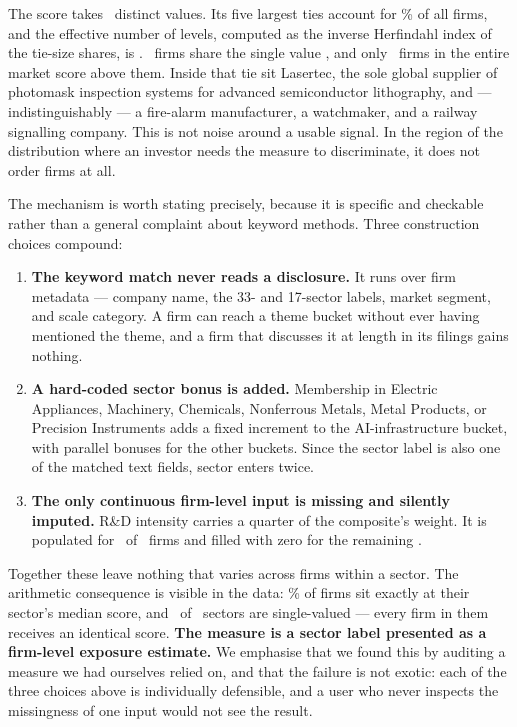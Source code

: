 \documentclass[a4paper,11pt]{article}
\begin{document}
The score takes \SatDistinct\ distinct values. Its five largest ties account for
\SatTopFiveShare\% of all firms, and the effective number of levels, computed as the inverse
Herfindahl index of the tie-size shares, is \SatEffLevels. \SatTieN\ firms share the single value
\SatTieValue, and only \SatAbove\ firms in the entire market score above them. Inside that tie sit
Lasertec, the sole global supplier of photomask inspection systems for advanced semiconductor
lithography, and --- indistinguishably --- a fire-alarm manufacturer, a watchmaker, and a railway
signalling company. This is not noise around a usable signal. In the region of the distribution where
an investor needs the measure to discriminate, it does not order firms at all.

The mechanism is worth stating precisely, because it is specific and checkable rather than a general
complaint about keyword methods. Three construction choices compound:

\begin{enumerate}\itemsep2pt
\item \textbf{The keyword match never reads a disclosure.} It runs over firm metadata --- company
name, the 33- and 17-sector labels, market segment, and scale category. A firm can reach a theme
bucket without ever having mentioned the theme, and a firm that discusses it at length in its filings
gains nothing.
\item \textbf{A hard-coded sector bonus is added.} Membership in Electric Appliances, Machinery,
Chemicals, Nonferrous Metals, Metal Products, or Precision Instruments adds a fixed increment to the
AI-infrastructure bucket, with parallel bonuses for the other buckets. Since the sector label is also
one of the matched text fields, sector enters twice.
\item \textbf{The only continuous firm-level input is missing and silently imputed.} R\&D intensity
carries a quarter of the composite's weight. It is populated for \SatRdPresent\ of
\SatFirms\ firms and filled with zero for the remaining \SatRdImputed.
\end{enumerate}

Together these leave nothing that varies across firms within a sector. The arithmetic consequence is
visible in the data: \SatSectorShare\% of firms sit exactly at their sector's median score, and
\SatSingleSectors\ of \SatSectors\ sectors are single-valued --- every firm in them receives an
identical score. \textbf{The measure is a sector label presented as a firm-level exposure
estimate.} We emphasise that we found this by auditing a measure we had ourselves relied on, and that
the failure is not exotic: each of the three choices above is individually defensible, and a user who
never inspects the missingness of one input would not see the result.
\end{document}
